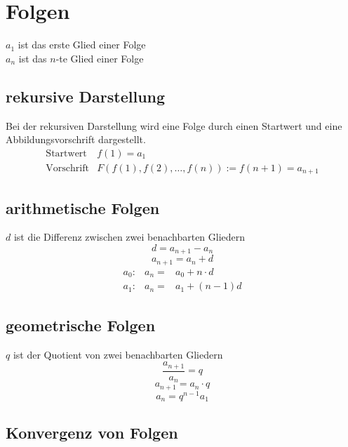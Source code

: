 \section{Folgen}
$a_1$ ist das erste Glied einer Folge\\
$a_n$ ist das $n$-te Glied einer Folge

\subsection{rekursive Darstellung}
Bei der rekursiven Darstellung wird eine Folge durch einen Startwert und eine Abbildungsvorschrift dargestellt. \\
\[ \boxed{ \begin{matrix}
\text{Startwert} & f(1) = a_1 \\
\text{Vorschrift} & F(f(1), f(2), \ldots, f(n)) := f(n + 1) = a_{n + 1}
\end{matrix}} \]

\subsection{arithmetische Folgen}
$d$ ist die Differenz zwischen zwei benachbarten Gliedern\\
\[ \boxed{d = a_{n+1} - a_n} \]
\[ \boxed{a_{n+1} = a_n + d} \]
\[ \boxed{ \begin{matrix} 
a_0 :& a_n =& a_0 + n \cdot d \\
a_1 :& a_n =& a_1 + (n - 1)d 
\end{matrix}}\]

\subsection{geometrische Folgen}
$q$ ist der Quotient von zwei benachbarten Gliedern\\
\[ \boxed{\frac{a_{n+1}}{a_n} = q} \]
\[ \boxed{a_{n+1} = a_n \cdot q} \]
\[ \boxed{a_n = q^{n-1} a_1} \]

\subsection{Konvergenz von Folgen}
